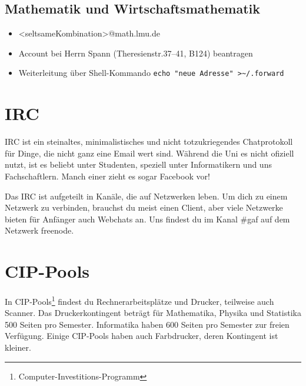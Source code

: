 \subsection*{Mathematik und Wirtschaftsmathematik\subjectList{\subjectM\subjectW}}
\begin{itemize}
	\item <seltsameKombination>@math.lmu.de
	\item Account bei Herrn Spann (Theresienstr.37--41, B124) beantragen
	\item Weiterleitung über Shell-Kommando \verb|echo "neue Adresse" >~/.forward|
\end{itemize}

\section{IRC}
IRC ist ein steinaltes, minimalistisches und nicht totzukriegendes
Chatprotokoll für Dinge, die nicht ganz eine Email wert sind. Während die Uni
es nicht ofiziell nutzt, ist es beliebt unter Studenten, speziell unter
Informatikern und uns Fachschaftlern. Manch einer zieht es sogar Facebook vor!

Das IRC ist aufgeteilt in Kanäle, die auf Netzwerken leben. Um dich zu einem
Netzwerk zu verbinden, brauchst du meist einen Client, aber viele Netzwerke
bieten für Anfänger auch Webchats an. Uns findest du im Kanal \#gaf auf dem
Netzwerk freenode.

\begin{urlList}
\end{urlList}

\section{CIP-Pools}
In CIP-Pools\footnote{Computer-Investitions-Programm} findest du Rechnerarbeitsplätze und Drucker, teilweise auch Scanner. Das Druckerkontingent beträgt für Mathematika, Physika und Statistika 500 Seiten pro Semester. Informatika haben 600 Seiten pro Semester zur freien Verfügung. Einige CIP-Pools haben auch Farbdrucker, deren Kontingent ist kleiner.

